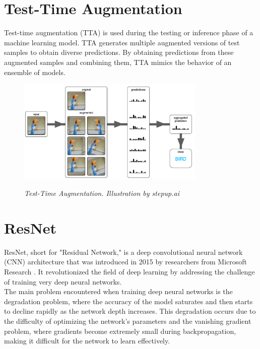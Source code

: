 \section{Test-Time Augmentation}

Test-time augmentation (TTA) is used during the testing or inference phase of a
machine learning model. TTA generates multiple augmented versions of test
samples to obtain diverse predictions. By obtaining predictions from these
augmented samples and combining them, TTA mimics the behavior of an ensemble of
models.

\begin{figure}[H]
  \centering
  \includegraphics[width=0.8\textwidth]{imatges/preliminaries/tta.png}
  \caption[Test-Time Augmentation]{\textit{Test-Time Augmentation. Illustration by stepup.ai}}
  {\label{fig:tta}}
\end{figure}

\newpage

\section{ResNet}

ResNet, short for "Residual Network," is a deep convolutional neural network
(CNN) architecture that was introduced in 2015 by researchers from Microsoft
Research \cite{ResNetPaper}. It revolutionized the field of deep learning by
addressing the challenge of training very deep neural networks. \\

The main problem encountered when training deep neural networks is the
degradation problem, where the accuracy of the model saturates and then starts
to decline rapidly as the network depth increases. This degradation occurs due
to the difficulty of optimizing the network's parameters and the vanishing
gradient problem, where gradients become extremely small during
backpropagation, making it difficult for the network to learn effectively.
\\

